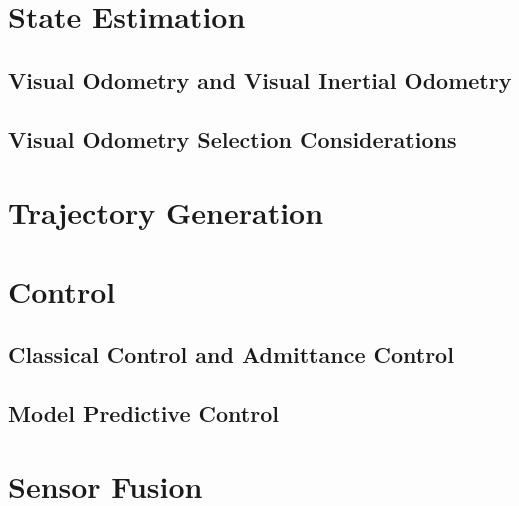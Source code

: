 \section{State Estimation}
\subsection{Visual Odometry and Visual Inertial Odometry}
\subsection{Visual Odometry Selection Considerations}
\section{Trajectory Generation}
\section{Control}
\subsection{Classical Control and Admittance Control}
\subsection{Model Predictive Control}
\section{Sensor Fusion}
